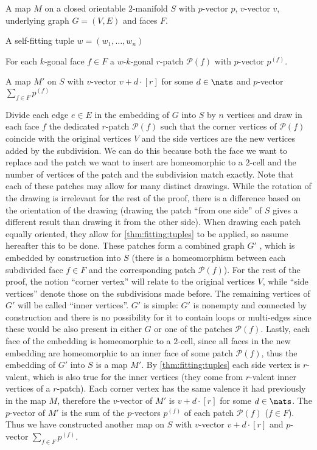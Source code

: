 \begin{construction}\label{const:map}
  \begin{cinput}
  \item A map $M$ on a closed orientable $2$-manifold $S$ with $p$-vector $p$, $v$-vector $v$, underlying graph $G = (V, E)$ and faces $F$. \item A self-fitting tuple $w = (w_1, \dots, w_n)$
  \item For each $k$-gonal face $f \in F$ a $w$-$k$-gonal $r$-patch $\mathcal{P}(f)$ with $p$-vector $p^{(f)}$.
  \end{cinput}
  \begin{coutput}
    \item A map $M'$ on $S$ with $v$-vector $v + d \cdot [r]$ for some $d \in \nats$ and $p$-vector $\sum_{f \in F} p^{(f)}$
  \end{coutput} 
  \begin{cdescription} 
    Divide each edge $e \in E$ in the embedding of $G$ into $S$ by $n$ vertices and draw in each face $f$ the dedicated $r$-patch $\mathcal{P}(f)$ such that the corner vertices of $\mathcal{P}(f)$ coincide with the original vertices $V$ and the side vertices are the new vertices added by the subdivision. We can do this because both the face we want to replace and the patch we want to insert are homeomorphic to a $2$-cell and the number of vertices of the patch and the subdivision match exactly. Note that each of these patches may allow for many distinct drawings. While the rotation of the drawing is irrelevant for the rest of the proof, there is a difference based on the orientation of the drawing (drawing the patch “from one side” of $S$ gives a different result than drawing it from the other side). When drawing each patch equally oriented, they allow for \autoref{thm:fitting:tuples} to be applied, so assume hereafter this to be done. These patches form a combined graph $G'$ , which is embedded by construction into $S$ (there is a homeomorphism between each subdivided face $f \in F$ and the corresponding patch $\mathcal{P}(f)$). For the rest of the proof, the notion ``corner vertex'' will relate to the original vertices $V$, while ``side vertices'' denote those on the subdivisions made before. The remaining vertices of $G'$ will be called ``inner vertices''. $G'$ is simple: $G'$ is nonempty and connected by construction and there is no possibility for it to contain loops or multi-edges since these would be also present in either $G$ or one of the patches $\mathcal{P}(f)$. Lastly, each face of the embedding is homeomorphic to a $2$-cell, since all faces in the new embedding are homeomorphic to an inner face of some patch $\mathcal{P}(f)$, thus the embedding of $G'$ into $S$ is a map $M'$. By \autoref{thm:fitting:tuples} each side vertex is $r$-valent, which is also true for the inner vertices (they come from $r$-valent inner vertices of a $r$-patch). Each corner vertex has the same valence it had previously in the map $M$, therefore the $v$-vector of $M'$ is $v + d \cdot [r]$ for some $d \in \nats$. The $p$-vector of $M'$ is the sum of the $p$-vectors $p^{(f)}$ of each patch $\mathcal{P}(f)$ ($f \in F$). Thus we have constructed another map on $S$ with $v$-vector $v + d \cdot [r]$ and $p$-vector $\sum_{f \in F} p^{(f)}$.

\end{cdescription}
\end{construction}
